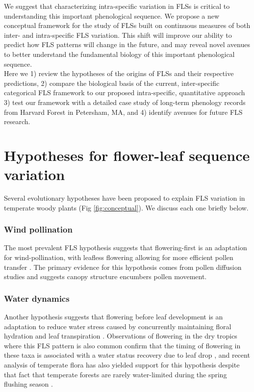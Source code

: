 \documentclass[12pt]{article}
\begin{document}
We suggest that characterizing intra-specific variation in FLSs is critical to understanding this important phenological sequence. We propose a new conceptual framework for the study of FLSs built on continuous measures of both inter- and intra-specific FLS variation. This shift will improve our ability to predict how FLS patterns will change in the future, and  may reveal novel avenues to better understand the fundamental biology of this important phenological sequence.\\


\noindent Here we 1) review the hypotheses of the origins of FLSs and their respective predictions, 2) compare the biological basis of the current, inter-specific categorical FLS framework to our proposed intra-specific, quantitative approach 3) test our framework with a detailed case study of long-term phenology records from Harvard Forest in Petersham, MA, and 4) identify avenues for future FLS research.

\section*{Hypotheses for flower-leaf sequence variation}
\noident Several evolutionary hypotheses have been proposed to explain FLS variation in temperate woody plants (Fig \ref{fig:conceptual}). We discuss each one briefly below.
\subsubsection*{ Wind pollination}
\noindent The most prevalent FLS hypothesis suggests that flowering-first is an adaptation for wind-pollination, with leafless flowering allowing for more efficient pollen transfer \citep{Whitehead1969}. The primary evidence for this hypothesis comes from pollen diffusion studies \citep[e.g., particle movement through closed and open canopies,][]{Niklas1985, Milleron2012} and suggests canopy structure encumbers pollen movement. %
\subsubsection*{Water dynamics}
\noindent Another hypothesis suggests that flowering before leaf development is an adaptation to reduce water stress caused by concurrently maintaining floral hydration and leaf transpiration \citep{Franklin2016}. Observations of flowering in the dry tropics where this FLS pattern is also common confirm that the timing of flowering in these taxa is associated with a water status recovery due to leaf drop \citep{Borchert1983,Reich1984}, and recent analysis of temperate flora has also yielded support for this hypothesis despite that fact that temperate forests are rarely water-limited during the spring flushing season \citep{Gougherty2018}. %
 
\end{document}
